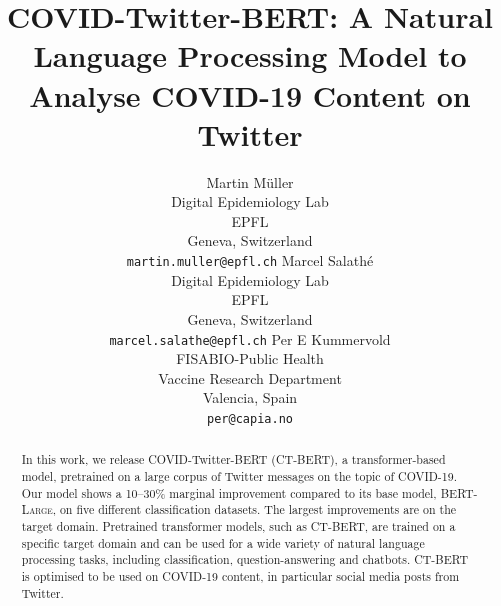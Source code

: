 \documentclass{article}
\title{COVID-Twitter-BERT: A Natural Language Processing Model to Analyse COVID-19 Content on Twitter}
\author{
  Martin M\"uller \\
  Digital Epidemiology Lab \\
  EPFL \\
  Geneva, Switzerland \\
  \texttt{martin.muller@epfl.ch}
    \And
  Marcel Salathé \\
  Digital Epidemiology Lab \\
  EPFL \\
  Geneva, Switzerland \\
  \texttt{marcel.salathe@epfl.ch}
    \AND
  Per E Kummervold \\
  FISABIO-Public Health \\
  Vaccine Research Department \\
  Valencia, Spain \\
  \texttt{per@capia.no}
}
\begin{document}
\maketitle

\begin{abstract}
  In this work, we release COVID-Twitter-BERT (\textsc{CT-BERT}), a transformer-based model, pretrained on a large corpus of Twitter messages on the topic of COVID-19.
  Our model shows a \numrange{10}{30}\% marginal improvement compared to its base model, \textsc{BERT-Large}, on five different classification datasets.
  The largest improvements are on the target domain.
  Pretrained transformer models, such as \textsc{CT-BERT}, are trained on a specific target domain and can be used for a wide variety of natural language processing tasks, including classification, question-answering and chatbots.
  \textsc{CT-BERT} is optimised to be used on COVID-19 content, in particular social media posts from Twitter.
\end{abstract}


\end{document}
